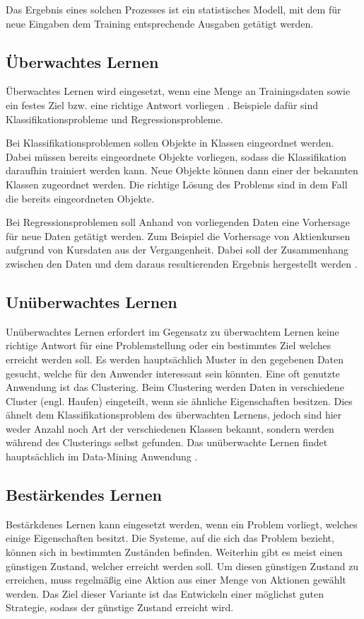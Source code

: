 Das Ergebnis eines solchen Prozesses ist ein statistisches Modell, mit dem für neue Eingaben dem Training entsprechende Ausgaben getätigt werden.

\subsection{Überwachtes Lernen}
\label{subsec:ueberwachtesLernen}
Überwachtes Lernen wird eingesetzt, wenn eine Menge an Trainingsdaten sowie ein festes Ziel bzw. eine richtige Antwort vorliegen \cite[vgl.][]{ueberwachtMaschLernen}. Beispiele dafür sind Klassifikationsprobleme und Regressionsprobleme.

Bei Klassifikationsproblemen sollen Objekte in Klassen eingeordnet werden. Dabei müssen bereits eingeordnete Objekte vorliegen, sodass die Klassifikation daraufhin trainiert werden kann. Neue Objekte können dann einer der bekannten Klassen zugeordnet werden. Die richtige Lösung des Problems sind in dem Fall die bereits eingeordneten Objekte.

Bei Regressionsproblemen soll Anhand von vorliegenden Daten eine Vorhersage für neue Daten getätigt werden. Zum Beispiel die Vorhersage von Aktienkursen aufgrund von Kursdaten aus der Vergangenheit. Dabei soll der Zusammenhang zwischen den Daten und dem daraus resultierenden Ergebnis hergestellt werden \cite[vgl.][]{RegKlass}.

\subsection{Unüberwachtes Lernen}
\label{subsec:unueberwachtesLernen}
Unüberwachtes Lernen erfordert im Gegensatz zu überwachtem Lernen keine richtige Antwort für eine Problemstellung oder ein bestimmtes Ziel welches erreicht werden soll. Es werden hauptsächlich Muster in den gegebenen Daten gesucht, welche für den Anwender interessant sein könnten. Eine oft genutzte Anwendung ist das Clustering. Beim Clustering werden Daten in verschiedene Cluster (engl. Haufen) eingeteilt, wenn sie ähnliche Eigenschaften besitzen. Dies ähnelt dem Klassifikationsproblem des überwachten Lernens, jedoch sind hier weder Anzahl noch Art der verschiedenen Klassen bekannt, sondern werden während des Clusterings selbst gefunden. Das unüberwachte Lernen findet hauptsächlich im Data-Mining Anwendung \cite[vgl.][]{ueberwachtMaschLernen}.

\subsection{Bestärkendes Lernen}
\label{subsec:bestaerkendesLernen}
Bestärkdenes Lernen kann eingesetzt werden, wenn ein Problem vorliegt, welches einige Eigenschaften besitzt. Die Systeme, auf die sich das Problem bezieht, können sich in bestimmten Zuständen befinden. Weiterhin gibt es meist einen günstigen Zustand, welcher erreicht werden soll. Um diesen günstigen Zustand zu erreichen, muss regelmäßig eine Aktion aus einer Menge von Aktionen gewählt werden. Das Ziel dieser Variante ist das Entwickeln einer möglichst guten Strategie, sodass der günstige Zustand erreicht wird.

